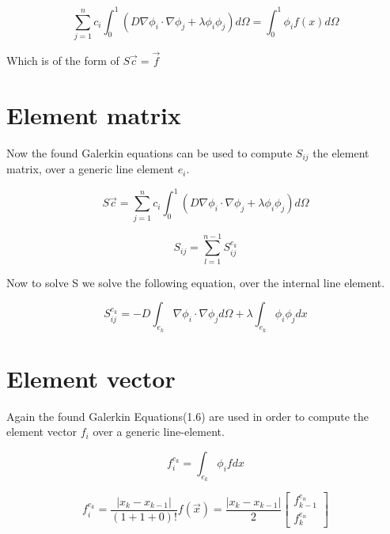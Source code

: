 \documentclass[a4paper]{report}
\begin{document}
\begin{equation}
	\sum_{j=1}^{n}c_i\int_{0}^{1} (D\nabla\phi_i\cdot\nabla\phi_j +\lambda\phi_i\phi_j )d\Omega = \int_{0}^{1} \phi_i f(x) d\Omega
\end{equation}
\medskip

Which is of the form of $ S\vec{c} = \vec{f} $

\section{Element matrix}\label{Element_matrix}
Now the found Galerkin equations can be used to compute $ S_{ij}$  the element matrix, over a generic line element $ e_i$.

\begin{equation}
S\vec{c}=	\sum_{j=1}^{n}c_i\int_{0}^{1} (D\nabla\phi_i\cdot\nabla\phi_j +\lambda\phi_i\phi_j )d\Omega
\end{equation}

\begin{equation}
S_{ij} =\sum_{l=1}^{n-1} S^{e_k}_{ij} 
\end{equation}
\medskip

Now to solve S we solve the following equation, over the internal line element.

\begin{equation}
S^{e_k}_{ij} = -D\int_{e_k}\nabla\phi_i\cdot\nabla\phi_j d\Omega+\lambda\int_{e_k}\phi_i\phi_j dx
\end{equation}


\section{Element vector}\label{Element_vector}
Again the found Galerkin Equations(1.6) are used in order to compute the element vector $f_i$ over a generic line-element.

\begin{equation}
f^{e_k}_i = \int_{e_k}\phi_i f dx
\end{equation}

\begin{equation}
	f^{e_k}_i =\frac{\lvert x_k-x_{k-1}\lvert}{(1+1+0)!}f(\vec{x}) =\frac{\lvert x_k-x_{k-1}\lvert}{2}
	\begin{bmatrix} f^{e_n}_{k-1}\\ f^{e_n}_{k}
	\end{bmatrix}
\end{equation}
\end{document}

